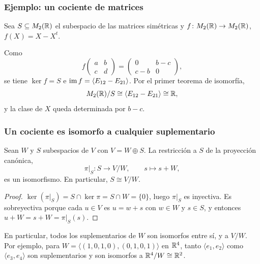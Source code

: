 \begin{frame}
    \frametitle{Ejemplo: un cociente de matrices}

    \begin{example}
        Sea $S\subseteq M_2(\mathbb{R})$ el subespacio de las matrices simétricas
        y $f\colon M_2(\mathbb{R})\to M_2(\mathbb{R})$, $f(X)=X-X^t$.
    \end{example}

    Como
    \[
        f\begin{pmatrix}a&b\\c&d\end{pmatrix}
        =\begin{pmatrix}0&b-c\\c-b&0\end{pmatrix},
    \]
    se tiene $\ker f=S$ e $\operatorname{im} f=\langle E_{12}-E_{21}\rangle$. Por
    el primer teorema de isomorfía,
    \[
        M_2(\mathbb{R})/S\cong\langle E_{12}-E_{21}\rangle\cong\mathbb{R},
    \]
    y la clase de $X$ queda determinada por $b-c$.
\end{frame}


\begin{frame}
    \frametitle{Un cociente es isomorfo a cualquier suplementario}

    \begin{proposition}
        Sean $W$ y $S$ subespacios de $V$ con $V=W\oplus S$. La restricción
        a $S$ de la proyección canónica,
        \[
            \pi|_S\colon S\longrightarrow V/W,\qquad s\mapsto s+W,
        \]
        es un isomorfismo. En particular, $S\cong V/W$.
    \end{proposition}

    \begin{proof}
        $\ker(\pi|_S)=S\cap\ker\pi=S\cap W=\{0\}$, luego $\pi|_S$ es
        inyectiva. Es sobreyectiva porque cada $u\in V$ es $u=w+s$ con
        $w\in W$ y $s\in S$, y entonces
        $u+W=s+W=\pi|_S(s)$.
    \end{proof}

    \medskip

    En particular, \alert{todos los suplementarios de $W$ son isomorfos
    entre sí}, y a $V/W$. Por ejemplo, para $W=\langle(1,0,1,0),(0,1,0,1)\rangle$
    en $\mathbb{R}^4$, tanto $\langle e_1,e_2\rangle$ como $\langle e_3,e_4\rangle$
    son suplementarios y son isomorfos a $\mathbb{R}^4/W\cong\mathbb{R}^2$.
\end{frame}


